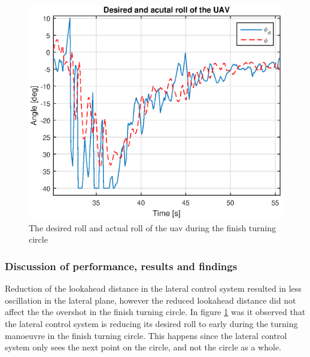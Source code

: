 \begin{figure}[H]
\centering
\includegraphics[scale=0.7]{figs/Experiment/rollDesired131844.eps}
\caption{The desired roll and actual roll of the \gls{uav} during the finish turning circle}
\label{Fig:DesiredRoll131844}
\end{figure}
\subsubsection{Discussion of performance, results and findings}
Reduction of the lookahead distance in the lateral control system resulted in less oscillation in the lateral plane, however the reduced lookahead distance did not affect the the overshot in the finish turning circle. In figure \ref{Fig:DesiredRoll131844} was it observed that the lateral control system is reducing its desired roll to early during the turning manoeuvre in the finish turning circle. This happens since the lateral control system only sees the next point on the circle, and not the circle as a whole.
